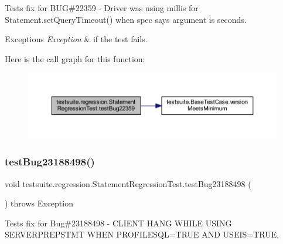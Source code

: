 Tests fix for B\+UG\#22359 -\/ Driver was using millis for Statement.\+set\+Query\+Timeout() when spec says argument is seconds.


\begin{DoxyExceptions}{Exceptions}
{\em Exception} & if the test fails. \\
\hline
\end{DoxyExceptions}
Here is the call graph for this function\+:
\nopagebreak
\begin{figure}[H]
\begin{center}
\leavevmode
\includegraphics[width=350pt]{classtestsuite_1_1regression_1_1_statement_regression_test_a0e9ad9980acf6229f9b41dff9972e1c5_cgraph}
\end{center}
\end{figure}
\mbox{\label{classtestsuite_1_1regression_1_1_statement_regression_test_ad2c60d7105fb694d073cddbd8e1cdd48}} 
\subsubsection{\texorpdfstring{test\+Bug23188498()}{testBug23188498()}}
{\footnotesize\ttfamily void testsuite.\+regression.\+Statement\+Regression\+Test.\+test\+Bug23188498 (\begin{DoxyParamCaption}{ }\end{DoxyParamCaption}) throws Exception}

Tests fix for Bug\#23188498 -\/ C\+L\+I\+E\+NT H\+A\+NG W\+H\+I\+LE U\+S\+I\+NG S\+E\+R\+V\+E\+R\+P\+R\+E\+P\+S\+T\+MT W\+H\+EN P\+R\+O\+F\+I\+L\+E\+S\+QL=T\+R\+UE A\+ND U\+S\+E\+IS=T\+R\+UE. \mbox{\label{classtestsuite_1_1regression_1_1_statement_regression_test_a3d0ac2b92441d18279f454eff53dff23}} 
